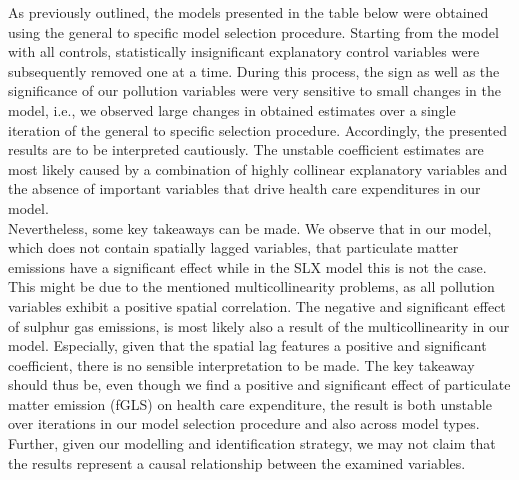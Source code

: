 \documentclass[
]{article}
\begin{document}
	As previously outlined, the models presented in the table below were obtained using the general to specific model selection procedure. Starting from the model with all controls, statistically insignificant explanatory control variables were subsequently removed one at a time. During this process, the sign as well as the significance of our pollution variables were very sensitive to small changes in the model, i.e., we observed large changes in obtained estimates over a single iteration of the general to specific selection procedure. Accordingly, the presented results are to be interpreted cautiously. The unstable coefficient estimates are most likely caused by a combination of highly collinear explanatory variables and the absence of important variables that drive health care expenditures in our model.\\ Nevertheless, some key takeaways can be made. We observe that in our model, which does not contain spatially lagged variables, that particulate matter emissions have a significant effect while in the SLX model this is not the case. This might be due to the mentioned multicollinearity problems, as all pollution variables exhibit a positive spatial correlation. The negative and significant effect of sulphur gas emissions, is most likely also a result of the multicollinearity in our model. Especially, given that the spatial lag features a positive and significant coefficient, there is no sensible interpretation to be made. The key takeaway should thus be, even though we find a positive and significant effect of particulate matter emission (fGLS) on health care expenditure, the result is both unstable over iterations in our model selection procedure and also across model types. Further, given our modelling and identification strategy, we may not claim that the results represent a causal relationship between the examined variables.
\end{document}
